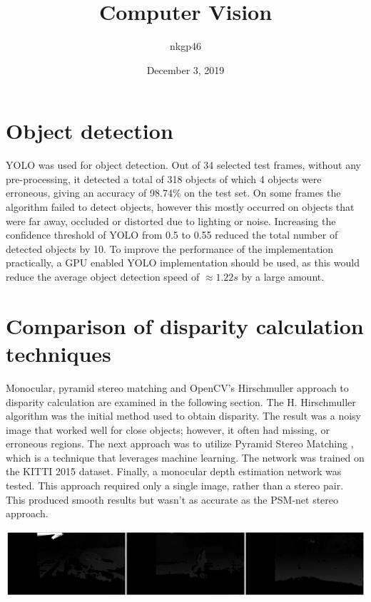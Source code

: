 \documentclass{article}
\title {\vspace{-5em}Computer Vision}
\author{\vspace{-8em}nkgp46}
\date{\vspace{-1em}December 3, 2019}
\begin{document}
	\maketitle
	
	\section{Object detection}
	
	YOLO was used for object detection. Out of 34 selected test frames, without any pre-processing, it detected a total of 318 objects of which 4 objects were erroneous, giving an accuracy of 98.74\% on the test set. On some frames the algorithm failed to detect objects, however this mostly occurred on objects that were far away, occluded or distorted due to lighting or noise. Increasing the confidence threshold of YOLO from 0.5 to 0.55 reduced the total number of detected objects by 10. To improve the performance of the implementation practically, a GPU enabled YOLO implementation should be used, as this would reduce the average object detection speed of $\approx 1.22s$ by a large amount.
	
	\section{Comparison of disparity calculation techniques}
	
	Monocular, pyramid stereo matching and OpenCV’s Hirschmuller approach to disparity calculation are examined in the following section. The H. Hirschmuller algorithm \cite{hirschmuller2007stereo} was the initial method used to obtain disparity. The result was a noisy image that worked well for close objects; however, it often had missing, or erroneous regions. The next approach was to utilize Pyramid Stereo Matching \cite{chang2018pyramid}, which is a technique that leverages machine learning. The network was trained on the KITTI 2015 \cite{Menze2015ISA, Menze2018JPRS} dataset. Finally, a monocular depth estimation network\cite{monodepth2} was tested. This approach required only a single image, rather than a stereo pair. This produced smooth results but wasn’t as accurate as the PSM-net stereo approach.
	
	\vspace{-0.5em}
	\begin{minipage}{1.0\linewidth}
		\begin{center}
			\includegraphics[width=1.0\linewidth]{"../_submission/disparity_hirschmuller.png"}
		\end{center}
	\end{minipage}
\end{document}
